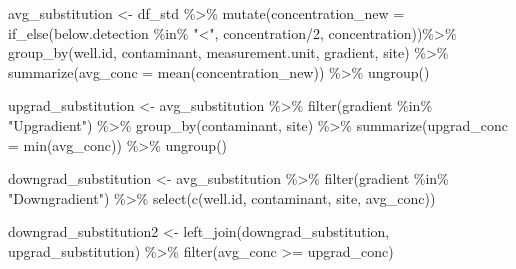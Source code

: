 \documentclass[12pt, twoside]{amherstthesis}
\newenvironment{Shaded}{\begin{snugshade}}{\end{snugshade}}
\newcommand{\AttributeTok}[1]{\textcolor[rgb]{0.77,0.63,0.00}{#1}}
\newcommand{\DecValTok}[1]{\textcolor[rgb]{0.00,0.00,0.81}{#1}}
\newcommand{\FunctionTok}[1]{\textcolor[rgb]{0.00,0.00,0.00}{#1}}
\newcommand{\NormalTok}[1]{#1}
\newcommand{\OtherTok}[1]{\textcolor[rgb]{0.56,0.35,0.01}{#1}}
\newcommand{\SpecialCharTok}[1]{\textcolor[rgb]{0.00,0.00,0.00}{#1}}
\newcommand{\StringTok}[1]{\textcolor[rgb]{0.31,0.60,0.02}{#1}}
\begin{document}
\begin{Shaded}
\begin{Highlighting}[]
\NormalTok{avg\_substitution }\OtherTok{\textless{}{-}}\NormalTok{ df\_std }\SpecialCharTok{\%\textgreater{}\%}
  \FunctionTok{mutate}\NormalTok{(}\AttributeTok{concentration\_new =} \FunctionTok{if\_else}\NormalTok{(below.detection }\SpecialCharTok{\%in\%} \StringTok{"\textless{}"}\NormalTok{, }
\NormalTok{                                     concentration}\SpecialCharTok{/}\DecValTok{2}\NormalTok{, }
\NormalTok{                                     concentration))}\SpecialCharTok{\%\textgreater{}\%}
  \FunctionTok{group\_by}\NormalTok{(well.id, contaminant, measurement.unit, gradient, site) }\SpecialCharTok{\%\textgreater{}\%}
  \FunctionTok{summarize}\NormalTok{(}\AttributeTok{avg\_conc =} \FunctionTok{mean}\NormalTok{(concentration\_new)) }\SpecialCharTok{\%\textgreater{}\%}
  \FunctionTok{ungroup}\NormalTok{()}

\NormalTok{upgrad\_substitution }\OtherTok{\textless{}{-}}\NormalTok{ avg\_substitution }\SpecialCharTok{\%\textgreater{}\%}
  \FunctionTok{filter}\NormalTok{(gradient }\SpecialCharTok{\%in\%} \StringTok{"Upgradient"}\NormalTok{) }\SpecialCharTok{\%\textgreater{}\%}
  \FunctionTok{group\_by}\NormalTok{(contaminant, site) }\SpecialCharTok{\%\textgreater{}\%}
  \FunctionTok{summarize}\NormalTok{(}\AttributeTok{upgrad\_conc =} \FunctionTok{min}\NormalTok{(avg\_conc)) }\SpecialCharTok{\%\textgreater{}\%}
  \FunctionTok{ungroup}\NormalTok{()}

\NormalTok{downgrad\_substitution }\OtherTok{\textless{}{-}}\NormalTok{ avg\_substitution }\SpecialCharTok{\%\textgreater{}\%}
  \FunctionTok{filter}\NormalTok{(gradient }\SpecialCharTok{\%in\%} \StringTok{"Downgradient"}\NormalTok{) }\SpecialCharTok{\%\textgreater{}\%}
  \FunctionTok{select}\NormalTok{(}\FunctionTok{c}\NormalTok{(well.id, contaminant, site, avg\_conc))}

\NormalTok{downgrad\_substitution2 }\OtherTok{\textless{}{-}} \FunctionTok{left\_join}\NormalTok{(downgrad\_substitution, }
\NormalTok{                                    upgrad\_substitution) }\SpecialCharTok{\%\textgreater{}\%}
  \FunctionTok{filter}\NormalTok{(avg\_conc }\SpecialCharTok{\textgreater{}=}\NormalTok{ upgrad\_conc) }


\end{Highlighting}
\end{Shaded}
\end{document}
